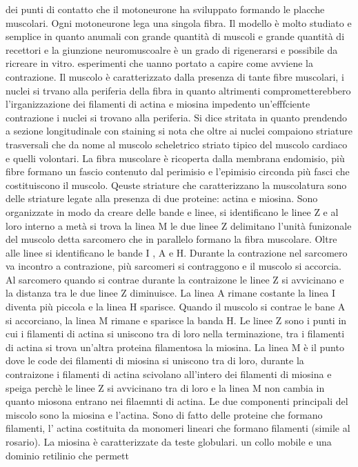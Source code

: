 dei punti di contatto che il motoneurone ha sviluppato formando le placche muscolari. Ogni motoneurone lega una singola fibra. Il modello \`e molto studiato e semplice in quanto anumali
con grande quantit\`a di muscoli e grande quantit\`a di recettori e la giunzione neuromuscoalre \`e un grado di rigenerarsi e possibile da ricreare in vitro. esperimenti che uanno 
portato a capire come avviene la contrazione. Il muscolo \`e caratterizzato dalla presenza di tante fibre muscolari, i nuclei si trvano alla periferia della fibra in quanto altrimenti 
comprometterebbero l'irganizzazione dei filamenti di actina e miosina impedento un'efffciente contrazione i nuclei si trovano alla periferia. Si dice stritata in quanto prendendo 
a sezione longitudinale con staining si nota che oltre ai nuclei compaiono striature trasversali che da nome al muscolo scheletrico striato tipico del muscolo cardiaco e quelli volontari.
La fibra muscolare \`e ricoperta dalla membrana endomisio, pi\`u fibre formano un fascio contenuto dal perimisio e l'epimisio circonda pi\`u fasci che costituiscono il muscolo. Qeuste
striature che caratterizzano la muscolatura sono delle striature legate alla presenza di due proteine: actina e miosina. Sono organizzate in modo da creare delle bande e linee, si 
identificano le linee Z e al loro interno a met\`a si trova la linea M le due linee Z delimitano l'unit\`a funizonale del muscolo detta sarcomero che in parallelo formano la fibra 
muscolare. Oltre alle linee si identificano le bande I , A e H. Durante la contrazione nel sarcomero va incontro a contrazione, pi\`u sarcomeri si contraggono e il muscolo si accorcia. 
Al sarcomero quando si contrae durante la contraizone le linee Z si avvicinano e la distanza tra le due linee Z diminuisce. La linea A rimane costante la linea I diventa pi\`u piccola
e la linea H sparisce. Quando il muscolo si contrae le bane A si accorciano, la linea M rimane e sparisce la banda H. Le linee Z sono i punti in cui i filamenti di actina si uniscono 
tra di loro nella terminazione, tra i filamenti di actina si trova un'altra proteina filamentosa la miosina. La linea M \`e il punto dove le code dei filamenti di miosina si uniscono 
tra di loro, durante la contraizone i filamenti di actina scivolano all'intero dei filamenti di miosina e speiga perch\`e le linee Z si avvicinano tra di loro e la linea M non cambia in
quanto miosona entrano nei filaemnti di actina. Le due componenti principali del miscolo sono la miosina e l'actina. Sono di fatto delle proteine che formano filamenti, l'
actina costituita da monomeri lineari che formano filamenti (simile al rosario). La miosina \`e caratterizzate da teste globulari. un collo mobile e una dominio retilinio che permett 
